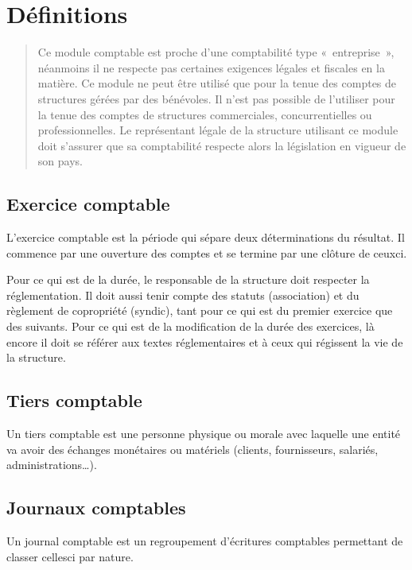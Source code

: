 \documentclass[a4paper,10pt,oneside,french]{sphinxmanual}
\begin{document}
\section{Définitions}
\label{\detokenize{accounting/definition:definitions}}\label{\detokenize{accounting/definition::doc}}\begin{quote}

\sphinxAtStartPar
{} Ce module comptable est proche d’une comptabilité type « entreprise », néanmoins il ne respecte pas certaines exigences légales et fiscales en la matière.
Ce module ne peut être utilisé que pour la tenue des comptes de structures gérées par des bénévoles. Il n’est pas possible de l’utiliser pour la tenue des comptes de structures commerciales, concurrentielles ou professionnelles.
Le représentant légale de la structure utilisant ce module doit s’assurer que sa comptabilité respecte alors la législation en vigueur de son pays.
\end{quote}


\subsection{Exercice comptable}
\label{\detokenize{accounting/definition:exercice-comptable}}
\sphinxAtStartPar
L’exercice comptable est la période qui sépare deux déterminations du résultat. Il commence par une ouverture des comptes et se termine par une clôture de ceux\sphinxhyphen{}ci.

\sphinxAtStartPar
Pour ce qui est de la durée, le responsable de la structure doit respecter la réglementation. Il doit aussi tenir compte des statuts (association) et du règlement de copropriété (syndic), tant pour ce qui est du premier exercice que des suivants. Pour ce qui est de la modification de la durée des exercices, là encore il doit se référer aux textes réglementaires et à ceux qui régissent la vie de la structure.


\subsection{Tiers comptable}
\label{\detokenize{accounting/definition:tiers-comptable}}
\sphinxAtStartPar
Un tiers comptable est une personne physique ou morale avec laquelle une entité va avoir des échanges monétaires ou matériels (clients, fournisseurs, salariés, administrations…).


\subsection{Journaux comptables}
\label{\detokenize{accounting/definition:journaux-comptables}}
\sphinxAtStartPar
Un journal comptable est un regroupement d’écritures comptables permettant de classer celles\sphinxhyphen{}ci par nature.
\end{document}
